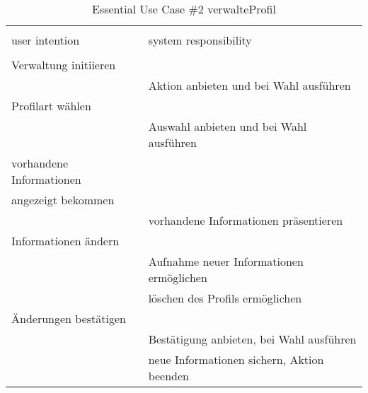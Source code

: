 \begin{table}[H]
\caption{Essential Use Case \#2 verwalteProfil }
\centering
\begin{tabular}{l l}
\\ [-0.5ex]

\hline\hline
\\ [-0.5ex]
user intention & system responsibility
\\ [1.5ex]
\hline
\\ [-0.5ex]
Verwaltung initiieren		& 											 \\[1ex]
							& Aktion anbieten und bei Wahl ausführen     \\[1ex]
Profilart wählen			& 											 \\[1ex]
							& Auswahl anbieten und bei Wahl ausführen	 \\[1ex]					
vorhandene Informationen	& 											 \\[1ex]
angezeigt bekommen			& 											 \\[1ex]
							& vorhandene Informationen präsentieren      \\[1ex] 
Informationen ändern 		& 											 \\[1ex] 
							& Aufnahme neuer Informationen ermöglichen	 \\[1ex]
							& löschen des Profils ermöglichen			 \\[1ex]
Änderungen bestätigen		& 											 \\[1ex]
							& Bestätigung anbieten, bei Wahl ausführen   \\[1ex]
							& neue Informationen sichern, Aktion beenden \\[1ex]

\hline
\end{tabular}
\label{tab:profilverwalten}
\end{table}



